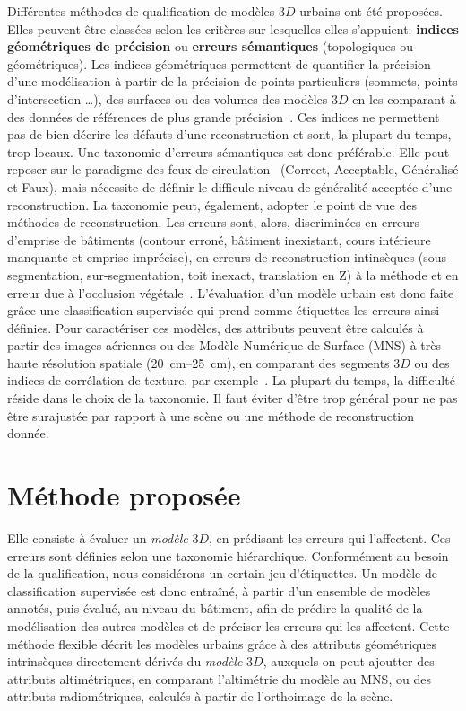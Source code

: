 \documentclass[a4paper,french]{article}
\begin{document}
    Différentes méthodes de qualification de modèles $3D$ urbains ont été proposées. Elles peuvent être classées selon les critères sur lesquelles elles s'appuient: \textbf{indices géométriques de précision} ou \textbf{erreurs sémantiques} (topologiques ou géométriques). Les indices géométriques permettent de quantifier la précision d'une modélisation à partir de la précision de points {\color{black}particuliers} (sommets, points d'intersection \dots), des surfaces ou des volumes des modèles $3D$ en les comparant à des données de références de plus grande précision~\cite{Zeng2014}. Ces indices ne permettent pas de bien décrire les défauts d'une reconstruction et sont, la plupart du temps, trop locaux. Une taxonomie d'erreurs sémantiques est donc préférable. Elle peut reposer sur le paradigme des feux de circulation~\cite{boudet2006supervised} (Correct, Acceptable, Généralisé et Faux){\color{black}, mais nécessite de définir le difficule niveau de généralité acceptée d'une reconstruction. La taxonomie peut, également,} adopter le point de vue des méthodes de reconstruction. Les erreurs sont, alors, discriminées en erreurs d'emprise de bâtiments (contour erroné, bâtiment inexistant, cours intérieure manquante et emprise imprécise), en erreurs de reconstruction intinsèques (sous-segmentation, sur-segmentation, toit inexact, translation en Z) à la méthode et en erreur due à l'occlusion végétale~\cite{Michelin2013}. L'évaluation d'un modèle urbain est donc faite grâce une classification supervisée qui prend comme étiquettes les erreurs ainsi définies. Pour caractériser ces modèles, des attributs peuvent être calculés à partir des images aériennes ou des Modèle Numérique de Surface (MNS) à très haute résolution spatiale (\SIrange{20}{25}{\cm}), en comparant des segments $3D$ ou des indices de corrélation de texture, par exemple{\color{black}~\cite{boudet2006supervised, Michelin2013}. La plupart du temps, la difficulté réside dans le choix de la taxonomie. Il faut éviter} d'être trop général pour ne pas être surajustée par rapport à une scène ou une méthode de reconstruction donnée.

    \section{Méthode proposée}

    Elle consiste à évaluer un \textit{modèle} $3D$, en prédisant les erreurs qui l'affectent. Ces erreurs sont définies selon une taxonomie hiérarchique. Conformément au besoin de la qualification, nous considérons un certain jeu d'étiquettes. Un modèle de classification supervisée est donc entraîné, à partir d'un ensemble de modèles annotés, puis évalué{\color{black}, au niveau du bâtiment,} afin de prédire la qualité de la modélisation des autres modèles et de préciser les erreurs qui les affectent. Cette méthode flexible décrit les modèles urbains grâce à des attributs géométriques intrinsèques directement dérivés du \textit{modèle} $3D$, auxquels on peut ajoutter des attributs altimétriques, en comparant l'altimétrie du modèle au MNS, ou des attributs radiométriques, calculés à partir de l'orthoimage de la scène.
\end{document}
